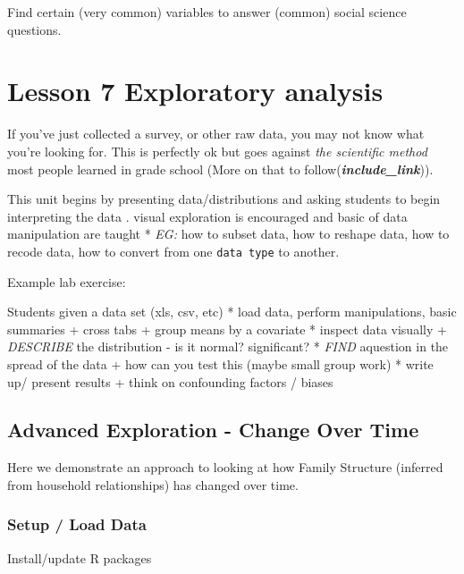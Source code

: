 \documentclass[
]{book}
\begin{document}
Find certain (very common) variables to answer (common) social science questions.

\hypertarget{lesson-7-exploratory-analysis}{%
\section*{Lesson 7 Exploratory analysis}\label{lesson-7-exploratory-analysis}}

If you've just collected a survey, or other raw data, you may not know what you're looking for. This is perfectly ok but goes against \emph{the scientific method} most people learned in grade school (More on that to follow(\textbf{\emph{include\_link}})).

This unit begins by presenting data/distributions and asking students to begin interpreting the data . visual exploration is encouraged and basic of data manipulation are taught
* \emph{EG:} how to subset data, how to reshape data, how to recode data, how to convert from one \texttt{data\ type} to another.

Example lab exercise:

Students given a data set (xls, csv, etc)
* load data, perform manipulations, basic summaries
+ cross tabs
+ group means by a covariate
* inspect data visually
+ \emph{DESCRIBE} the distribution - is it normal? significant?
* \emph{FIND} aquestion in the spread of the data
+ how can you test this (maybe small group work)
* write up/ present results
+ think on confounding factors / biases

\hypertarget{advanced-exploration---change-over-time}{%
\subsection*{Advanced Exploration - Change Over Time}\label{advanced-exploration---change-over-time}}

Here we demonstrate an approach to looking at how Family Structure (inferred from household relationships) has changed over time.

\hypertarget{setup-load-data}{%
\subsubsection*{Setup / Load Data}\label{setup-load-data}}

Install/update R packages
\end{document}
